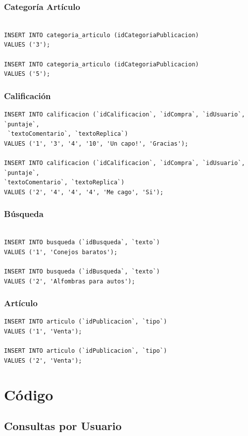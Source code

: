 \documentclass[a4paper, 10pt, twoside]{article}
\begin{document}
\subsubsection{Categor\'ia Art\'iculo}
\begin{verbatim}

INSERT INTO categoria_articulo (idCategoriaPublicacion) 
VALUES ('3');

INSERT INTO categoria_articulo (idCategoriaPublicacion) 
VALUES ('5');
\end{verbatim}
\subsubsection{Calificaci\'on}
\begin{verbatim}
INSERT INTO calificacion (`idCalificacion`, `idCompra`, `idUsuario`, `puntaje`,
 `textoComentario`, `textoReplica`) 
VALUES ('1', '3', '4', '10', 'Un capo!', 'Gracias');

INSERT INTO calificacion (`idCalificacion`, `idCompra`, `idUsuario`, `puntaje`, 
`textoComentario`, `textoReplica`) 
VALUES ('2', '4', '4', '4', 'Me cago', 'Si');
\end{verbatim}

\subsubsection{B\'usqueda}
\begin{verbatim}

INSERT INTO busqueda (`idBusqueda`, `texto`) 
VALUES ('1', 'Conejos baratos');

INSERT INTO busqueda (`idBusqueda`, `texto`) 
VALUES ('2', 'Alfombras para autos');
\end{verbatim}
\newpage
\subsubsection{Art\'iculo}
\begin{verbatim}
INSERT INTO articulo (`idPublicacion`, `tipo`) 
VALUES ('1', 'Venta');

INSERT INTO articulo (`idPublicacion`, `tipo`)
VALUES ('2', 'Venta');
\end{verbatim}

\section{C\'odigo}
\subsection{Consultas por Usuario}
\end{document}
